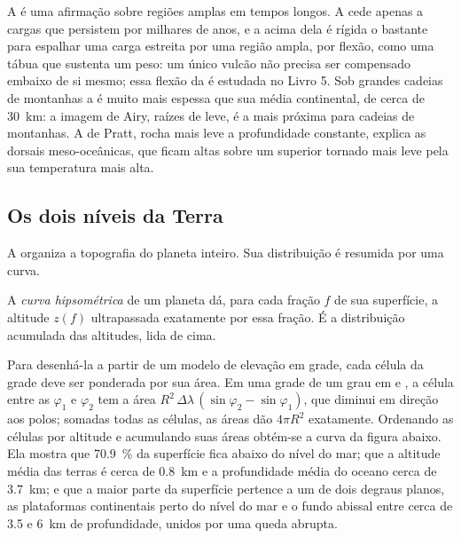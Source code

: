 A  é uma afirmação sobre regiões amplas em tempos longos. A  cede
apenas a cargas que persistem por milhares de anos, e a  acima dela é rígida o bastante para espalhar uma carga estreita por uma região ampla, por flexão,
como uma tábua que sustenta um peso: um único vulcão não precisa ser compensado embaixo de
si mesmo; essa flexão da  é estudada no Livro 5. Sob grandes cadeias de montanhas a  é muito mais espessa que sua média continental, de cerca de
\qty{30}{km}: a imagem de Airy, raízes de  leve, é a mais próxima para cadeias de montanhas. A de Pratt, rocha mais leve a profundidade constante, explica as
dorsais meso-oceânicas, que ficam altas sobre um  superior tornado mais leve pela
sua temperatura mais alta.

\subsection*{Os dois níveis da Terra}

A  organiza a topografia do planeta inteiro. Sua distribuição é
resumida por uma curva.

\begin{definition}\label{def:b1:isostasy-gravity:hypsometry}
A \emph{curva hipsométrica} de um planeta dá, para
cada fração $f$ de sua superfície, a altitude $z(f)$ ultrapassada exatamente por essa
fração. É a distribuição acumulada das altitudes, lida de cima.
\end{definition}

Para desenhá-la a partir de um modelo de elevação em grade, cada célula da grade deve ser ponderada por
sua área. Em uma grade de um grau em  e , a célula entre
as  $\varphi_1$ e $\varphi_2$ tem a área
$R^2\,\Delta\lambda\,(\sin\varphi_2 - \sin\varphi_1)$, que diminui em direção aos
polos; somadas todas as células, as áreas dão $4\pi R^2$ exatamente. Ordenando as
células por altitude e acumulando suas áreas obtém-se a curva da figura
abaixo. Ela mostra que \qty{70.9}{\percent} da superfície fica abaixo do nível do mar;
que a altitude média das terras é cerca de \qty{0.8}{km} e a profundidade média do
oceano cerca de \qty{3.7}{km}; e que a maior parte da superfície pertence a um de
dois degraus planos, as plataformas continentais perto do nível do mar e o fundo abissal
entre cerca de 3.5 e \qty{6}{km} de profundidade, unidos por uma queda abrupta.

